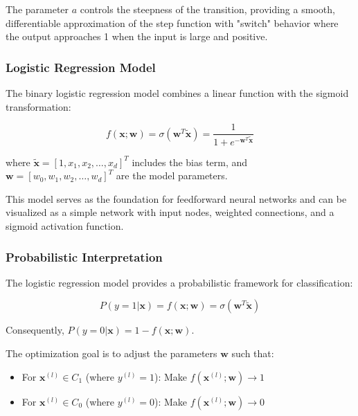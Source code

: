 \documentclass[twoside]{article}
\numberwithin{equation}{section}
\begin{document}
	The parameter $a$ controls the steepness of the transition, providing a smooth, differentiable approximation of the step function with "switch" behavior where the output approaches 1 when the input is large and positive.

	\subsubsection{Logistic Regression Model}
	\label{subsubsec:LogisticRegressionModel}
	The binary logistic regression model combines a linear function with the sigmoid transformation:

	\begin{equation}
	\label{eq:LogisticRegressionModel}
		\boxed{f(\mathbf{x}; \mathbf{w}) = \sigma(\mathbf{w}^T \tilde{\mathbf{x}}) = \frac{1}{1 + e^{-\mathbf{w}^T \tilde{\mathbf{x}}}}}
	\end{equation}

	where $\tilde{\mathbf{x}} = [1, x_1, x_2, \ldots, x_d]^T$ includes the bias term, and $\mathbf{w} = [w_0, w_1, w_2, \ldots, w_d]^T$ are the model parameters.

	This model serves as the foundation for feedforward neural networks and can be visualized as a simple network with input nodes, weighted connections, and a sigmoid activation function.

	\subsubsection{Probabilistic Interpretation}
	\label{subsubsec:ProbabilisticInterpretation}
	The logistic regression model provides a probabilistic framework for classification:

	\begin{equation}
	\label{eq:ClassProbabilities}
		\boxed{P(y = 1 | \mathbf{x}) = f(\mathbf{x}; \mathbf{w}) = \sigma(\mathbf{w}^T \tilde{\mathbf{x}})}
	\end{equation}

	Consequently, $P(y = 0 | \mathbf{x}) = 1 - f(\mathbf{x}; \mathbf{w})$.

	The optimization goal is to adjust the parameters $\mathbf{w}$ such that:
	\begin{itemize}
		\item For $\mathbf{x}^{(l)} \in C_1$ (where $y^{(l)} = 1$): Make $f(\mathbf{x}^{(l)}; \mathbf{w}) \to 1$
		\item For $\mathbf{x}^{(l)} \in C_0$ (where $y^{(l)} = 0$): Make $f(\mathbf{x}^{(l)}; \mathbf{w}) \to 0$
	\end{itemize}
\end{document}
